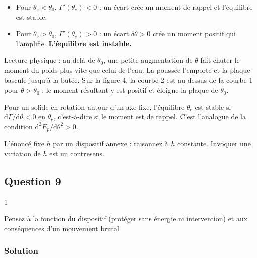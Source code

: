\documentclass[11pt,a4paper]{article}
\providecommand{\tightlist}{\setlength{\itemsep}{0pt}\setlength{\parskip}{0pt}}
\begin{document}
\begin{itemize}
\tightlist
\item
  Pour \(\theta_e<\theta_0\), \(\Gamma'(\theta_e)<0\) : un écart crée un moment de rappel et l'équilibre est stable.
\item
  Pour \(\theta_e>\theta_0\), \(\Gamma'(\theta_e)>0\) : un écart \(\delta\theta>0\) crée un moment positif qui l'amplifie. \textbf{L'équilibre est instable.}
\end{itemize}

Lecture physique : au-delà de \(\theta_0\), une petite augmentation de \(\theta\) fait chuter le moment du poids plus vite que celui de l'eau. La poussée l'emporte et la plaque bascule jusqu'à la butée. Sur la figure 4, la courbe 2 est au-dessus de la courbe 1 pour \(\theta>\theta_0\) : le moment résultant y est positif et éloigne la plaque de \(\theta_0\).

\begin{methode}

Pour un solide en rotation autour d'un axe fixe, l'équilibre \(\theta_e\) est stable si \(\mathrm d\Gamma/\mathrm d\theta<0\) en \(\theta_e\), c'est-à-dire si le moment est de rappel. C'est l'analogue de la condition \(\mathrm d^2E_p/\mathrm d\theta^2>0\).

\end{methode}

\begin{piege}

L'énoncé fixe \(h\) par un dispositif annexe : raisonnez à \(h\) constante. Invoquer une variation de \(h\) est un contresens.

\end{piege}

\hypertarget{question-9}{%
\subsection{Question 9}\label{question-9}}

\begin{indication}{1}

Pensez à la fonction du dispositif (protéger sans énergie ni intervention) et aux conséquences d'un mouvement brutal.

\end{indication}

\hypertarget{solution-8}{%
\subsubsection{Solution}\label{solution-8}}
\end{document}
